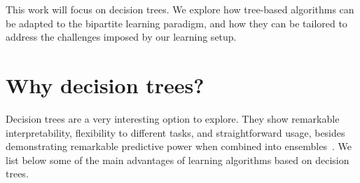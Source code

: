 \begin{itemize}
This work will focus on decision trees. We explore how tree-based algorithms can be adapted to the bipartite learning paradigm, and how they can be tailored to address the challenges imposed by our learning setup.


\section{Why decision trees?}
\label{sec:why dt}

Decision trees are a very interesting option to explore. They show remarkable interpretability, flexibility to different tasks, and straightforward usage, besides demonstrating remarkable predictive power when combined into ensembles~\cite{breiman2001random,chen2016xgboost,zhou2019deep,grinsztajn2022why}.  %
We list below some of the main advantages of learning algorithms based on decision trees.


\end{itemize}
